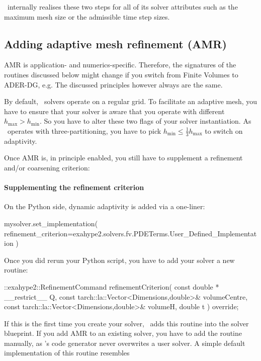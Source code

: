 \ExaHyPE\ internally realises these two steps for all of its solver attributes
such as the maximum mesh size or the admissible time step sizes.


\subsection{Adding adaptive mesh refinement (AMR)}


\begin{remark}
 AMR is application- and numerics-specific. Therefore, the signatures of the
 routines discussed below might change if you switch from Finite Volumes to
 ADER-DG, e.g. The discussed principles however always are the same.
\end{remark}


By default, \ExaHyPE\ solvers operate on a regular grid.
To facilitate an adaptive mesh, you have to ensure that your solver is aware that you operate 
with different $h_{\text{max}}>h_{\text{min}}$. 
So you have to alter these two flags of your solver instantiation.
As \Peano\ operates with three-partitioning, you have to pick 
$h_{\text{min}} \leq \frac{1}{3} h_{\text{max}}$ to switch on adaptivity.

Once AMR is, in principle enabled, you still have to supplement a refinement and/or coarsening criterion:



\paragraph{Supplementing the refinement criterion}
%
On the Python side, dynamic adaptivity is added via a one-liner:

\begin{code}
mysolver.set_implementation(
 refinement_criterion=exahype2.solvers.fv.PDETerms.User_Defined_Implementation 
)
\end{code}


\noindent
Once you did rerun your Python script, you have to add your solver a new
routine:

\begin{code}
::exahype2::RefinementCommand refinementCriterion(
  const double * __restrict__ Q,
  const tarch::la::Vector<Dimensions,double>&  volumeCentre,
  const tarch::la::Vector<Dimensions,double>&  volumeH,
  double                                       t
) override;
\end{code}


\noindent
If this is the first time you create your solver, \ExaHyPE\ adds this routine
into the solver blueprint.
If you add AMR to an existing solver, you have to add the routine manually, as
\ExaHyPE's code generator never overwrites a user solver.
A simple default implementation of this routine resembles

